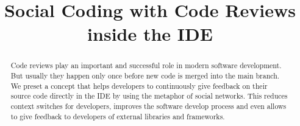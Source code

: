 \documentclass[10pt, conference]{IEEEtran}
\begin{document}
%
\title{Social Coding with Code Reviews inside the IDE}



\author{
}


% 



\maketitle


\begin{abstract}
Code reviews play an important and successful role in modern software development. 
%
But usually they happen only once before new code is merged into the main branch.
%
We preset a concept that helps developers to continuously give feedback on their source code directly in the IDE by using the metaphor of social networks. 
%
This reduces context switches for developers, improves the software develop process and even allows to give feedback to developers of external libraries and frameworks. 
\end{abstract}
\end{document}
